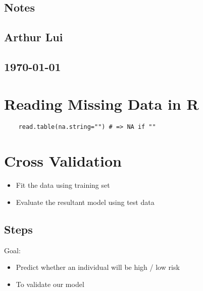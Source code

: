 \documentclass{article}                                                   %
\begin{document}
\begin{center}                                                            %
  \section*{Notes}                                                        %
  \subsection*{Arthur Lui}                                                %
  \subsection*{\noindent\today}                                           %
\end{center}                                                              %

\section{Reading Missing Data in R}
  \begin{verbatim} 
    read.table(na.string="") # => NA if ""
  \end{verbatim}  

\section{Cross Validation}
  \begin{itemize}
    \item Fit the data using training set
    \item Evaluate the resultant model using test data
  \end{itemize}
  
  \subsection{Steps}  
    Goal: \begin{itemize}
            \item Predict whether an individual will be high / low risk
            \item To validate our model
          \end{itemize}  
    
\end{document}
